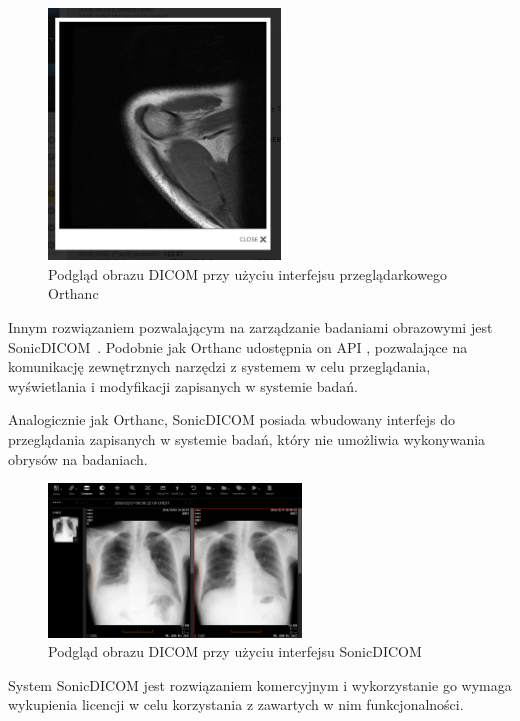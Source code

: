 \documentclass[a4paper,11pt,twoside,openright]{report}
\theoremstyle{definition}
\begin{document}
\begin{figure}[tbh!]
	\center
	\includegraphics[width=0.55\textwidth]{Orthanc-preview}
	\caption{Podgląd obrazu DICOM przy użyciu interfejsu przeglądarkowego Orthanc}
    	\label{fig:Orthanc-preview}
\end{figure}

Innym rozwiązaniem pozwalającym na zarządzanie badaniami obrazowymi jest SonicDICOM~\cite{SonicDICOM}.
Podobnie jak Orthanc udostępnia on API \cite{SonicDICOM API}, pozwalające na komunikację zewnętrznych narzędzi
z systemem w celu przeglądania, wyświetlania i modyfikacji zapisanych w systemie badań.

Analogicznie jak Orthanc, SonicDICOM posiada wbudowany interfejs do przeglądania
zapisanych w systemie badań, który nie umożliwia wykonywania obrysów na badaniach.

\begin{figure}[tb!]
	\center
	\includegraphics[width=0.6\textwidth]{SoniCDICOMViewer}
	\caption{Podgląd obrazu DICOM przy użyciu interfejsu SonicDICOM \cite{SonicDICOM API}}
    	\label{fig:SonicDICOM}
\end{figure}

System SonicDICOM jest rozwiązaniem komercyjnym i wykorzystanie go wymaga wykupienia
licencji w celu korzystania z zawartych w nim funkcjonalności.
\end{document}
